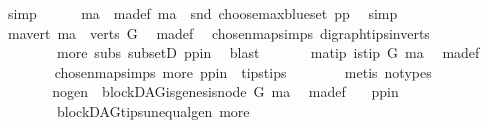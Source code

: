 \begin{isabellebody}
\ simp\isanewline
\ \ \ \ \isamarkupfalse%
\ ma\ \ ma{\isacharunderscore}{\kern0pt}def{\isacharcolon}{\kern0pt}\ {\isachardoublequoteopen}ma\ {\isacharequal}{\kern0pt}\ {\isacharparenleft}{\kern0pt}snd\ {\isacharparenleft}{\kern0pt}choose{\isacharunderscore}{\kern0pt}max{\isacharunderscore}{\kern0pt}blue{\isacharunderscore}{\kern0pt}set\ pp{\isacharparenright}{\kern0pt}{\isacharparenright}{\kern0pt}{\isachardoublequoteclose}\ \isamarkupfalse%
\ simp\isanewline
\ \ \ \ \isamarkupfalse%
\ ma{\isacharunderscore}{\kern0pt}vert{\isacharcolon}{\kern0pt}\ {\isachardoublequoteopen}ma\ {\isasymin}\ verts\ G{\isachardoublequoteclose}\ \isamarkupfalse%
\ ma{\isacharunderscore}{\kern0pt}def\ \isamarkupfalse%
\ chosen{\isacharunderscore}{\kern0pt}map{\isacharunderscore}{\kern0pt}simps{\isacharparenleft}{\kern0pt}{}{\isacharparenright}{\kern0pt}\ digraph{\isachardot}{\kern0pt}tips{\isacharunderscore}{\kern0pt}in{\isacharunderscore}{\kern0pt}verts\isanewline
\ \ \ \ \ \ \ \ more{\isacharparenleft}{\kern0pt}{}{\isacharparenright}{\kern0pt}\ subs\ subsetD\ pp{\isacharunderscore}{\kern0pt}in\ \isamarkupfalse%
\ blast\ \isanewline
\ \ \ \ \isamarkupfalse%
\ ma{\isacharunderscore}{\kern0pt}tip{\isacharcolon}{\kern0pt}\ {\isachardoublequoteopen}is{\isacharunderscore}{\kern0pt}tip\ G\ ma{\isachardoublequoteclose}\ \isamarkupfalse%
\ ma{\isacharunderscore}{\kern0pt}def\isanewline
\ \ \ \ \ \ \isamarkupfalse%
\ chosen{\isacharunderscore}{\kern0pt}map{\isacharunderscore}{\kern0pt}simps{\isacharparenleft}{\kern0pt}{}{\isacharparenright}{\kern0pt}\ more\ pp{\isacharunderscore}{\kern0pt}in\ \ tips{\isacharunderscore}{\kern0pt}tips\isanewline
\ \ \ \ \ \ \isamarkupfalse%
\ {\isacharparenleft}{\kern0pt}metis\ {\isacharparenleft}{\kern0pt}no{\isacharunderscore}{\kern0pt}types{\isacharparenright}{\kern0pt}{\isacharparenright}{\kern0pt}\ \ \ \ \ \ \ \ \ \ \isanewline
\ \ \ \ \isamarkupfalse%
\ \isamarkupfalse%
\ no{\isacharunderscore}{\kern0pt}gen{\isacharcolon}{\kern0pt}\ {\isachardoublequoteopen}{\isasymnot}\ blockDAG{\isachardot}{\kern0pt}is{\isacharunderscore}{\kern0pt}genesis{\isacharunderscore}{\kern0pt}node\ G\ ma{\isachardoublequoteclose}\ \isamarkupfalse%
\ ma{\isacharunderscore}{\kern0pt}def\ \ \isamarkupfalse%
\ pp{\isacharunderscore}{\kern0pt}in\ \isanewline
\ \ \ \ \ \ \ \ blockDAG{\isachardot}{\kern0pt}tips{\isacharunderscore}{\kern0pt}unequal{\isacharunderscore}{\kern0pt}gen\ more\isanewline

\end{isabellebody}
